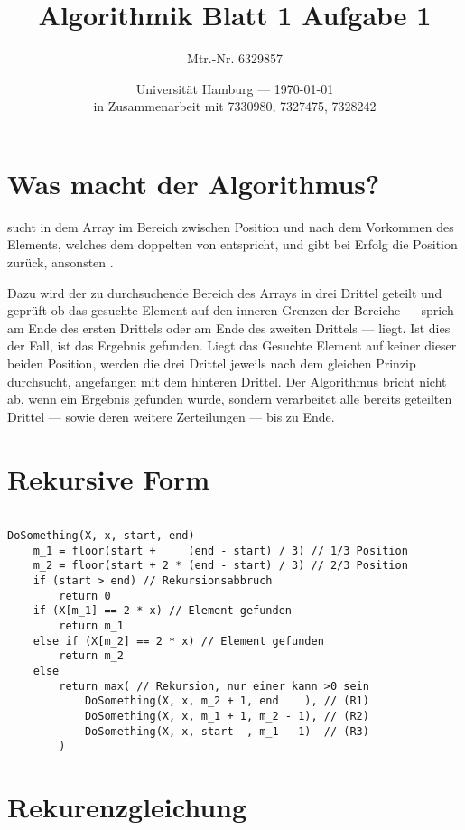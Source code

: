 \documentclass[parskip=half,a4paper]{scrartcl}
\title{Algorithmik Blatt 1 Aufgabe 1}
\author{Mtr.-Nr. 6329857}
\date{Universität Hamburg --- \today \\ in Zusammenarbeit mit 7330980, 7327475, 7328242}
\begin{document}
\maketitle %

\section*{Was macht der Algorithmus?}

 sucht in dem Array  im Bereich zwischen Position
 und  nach dem Vorkommen des Elements, welches dem doppelten von 
entspricht, und gibt bei Erfolg die Position zurück, ansonsten .

Dazu wird der zu durchsuchende Bereich des Arrays in drei Drittel geteilt und geprüft ob das gesuchte Element auf den inneren Grenzen der Bereiche --- sprich am Ende des ersten Drittels oder am Ende des zweiten Drittels --- liegt. Ist dies der Fall, ist das Ergebnis gefunden. Liegt das Gesuchte Element auf keiner dieser beiden Position, werden die drei Drittel jeweils nach dem gleichen Prinzip durchsucht, angefangen mit dem hinteren Drittel. Der Algorithmus bricht nicht ab, wenn ein Ergebnis gefunden wurde, sondern verarbeitet alle bereits geteilten Drittel --- sowie deren weitere Zerteilungen --- bis zu Ende.

\section*{Rekursive Form}

\begin{verbatim}

DoSomething(X, x, start, end)
    m_1 = floor(start +     (end - start) / 3) // 1/3 Position
    m_2 = floor(start + 2 * (end - start) / 3) // 2/3 Position
    if (start > end) // Rekursionsabbruch
        return 0
    if (X[m_1] == 2 * x) // Element gefunden
        return m_1
    else if (X[m_2] == 2 * x) // Element gefunden
        return m_2
    else
        return max( // Rekursion, nur einer kann >0 sein
            DoSomething(X, x, m_2 + 1, end    ), // (R1)
            DoSomething(X, x, m_1 + 1, m_2 - 1), // (R2)
            DoSomething(X, x, start  , m_1 - 1)  // (R3)
        )

\end{verbatim}

\section*{Rekurenzgleichung}
\end{document}
